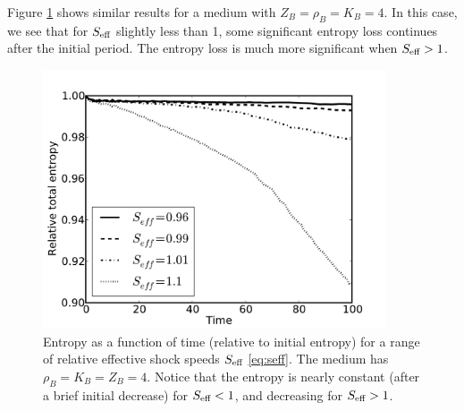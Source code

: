 Figure \ref{fig:ent_cshockic2} shows similar results for a medium with
$Z_B=\rho_B=K_B=4$.  In this case, we see that for $S_\textup{eff}$ slightly
less than 1, some significant entropy loss continues after the initial
period.  The entropy loss is much more significant when $S_\textup{eff}>1$.


\begin{figure}
\centerline{
\includegraphics[width=4in]{figures/shock_ic_entropy_Z4.pdf}}
\caption{Entropy as a function of time (relative to initial entropy)
for a range of relative effective shock speeds $S_\textup{eff}$ \eqref{eq:seff}.
The medium has $\rho_B=K_B=Z_B=4$.
Notice that the entropy is nearly constant (after a brief initial decrease) for
$S_\textup{eff}<1$, and decreasing for $S_\textup{eff}>1$.\label{fig:ent_cshockic2}}
\end{figure}


